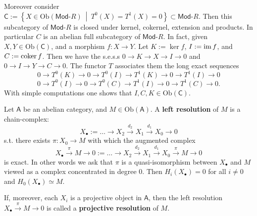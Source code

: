 \begin{ex}
	Moreover consider $\mathsf{C} := \left\{ X \in \mathrm{Ob} \left(\mathsf{Mod}\text{-}R\right) \ \middle|\ 
	T^0(X) = T^1(X) = 0\right\} \subset \mathsf{Mod}\text{-}R$.
	Then this subcategory of $\mathsf{Mod}\text{-}R$ is closed under
	kernel, cokernel, extension and products.
	In particular $C$ is an abelian full subcategory of $\mathsf{Mod}\text{-}R$.
	In fact, given $X, Y \in \mathrm{Ob} \left(\mathsf{C}\right)$, and a morphism $f: X \to Y$.
	Let $K := \ker f$, $I := \operatorname{im} f$, and $C := \operatorname{coker} f$.
	Then we have the s.e.s.s
	$0 \to K \to X \to I \to 0$ and $0 \to I \to Y \to C \to 0$.
	The functor $T$ associates them the long exact sequences
	\begin{equation}
		0 \to T^0(K) \to 0 \to T^0(I) \to
		T^1(K) \to 0 \to T^1(I) \to 0
	\end{equation} 
	\begin{equation}
		0 \to T^0(I) \to 0 \to T^0(C) \to
		T^1(I) \to 0 \to T^1(C) \to 0
	.\end{equation} 
	With simple computations one shows that $I, C, K \in \mathrm{Ob} \left(\mathsf{C}\right)$.
\end{ex} 

\begin{defn}
	Let $\mathsf{A}$ be an abelian category, and $M \in \mathrm{Ob} \left(\mathsf{A}\right)$.
	A \textbf{left resolution} of $M$ is a chain-complex:
	\begin{equation}
		X_{\bullet} := \ldots \to X_2 \xrightarrow{d_2} X_1 \xrightarrow{d_1} X_0 \to 0
	\end{equation} 
	s.t. there exists $\pi: X_0 \to M$ with which the augmented complex
	\begin{equation}
	X_{\bullet} \xrightarrow{\pi} M \to 0 := \ldots \to X_2 \xrightarrow{d_2} 
	X_1 \xrightarrow{d_1} X_0 \xrightarrow{\pi} M \to 0
	\end{equation} 
	is exact.
	In other words we ask that $\pi$ is a quasi-isomorphism between $X_{\bullet}$ and $M$
	viewed as a complex concentrated in degree $0$.
	Then $H_i(X_{\bullet}) = 0$ for all $i \neq 0$
	and $H_0(X_{\bullet}) \simeq M$.

	If, moreover, each $X_i$ is a projective object in $\mathsf{A}$, then
	the left resolution $X_{\bullet} \xrightarrow{\pi} M \to 0$ is called a
	\textbf{projective resolution} of $M$.
\end{defn}

